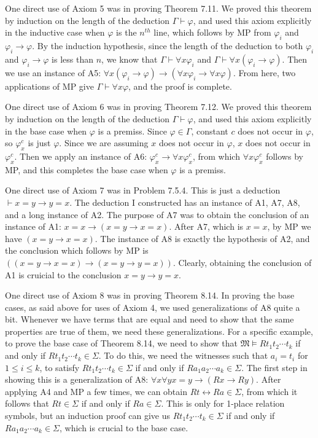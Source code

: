 \documentclass[11pt]{hmcpset}
\newenvironment{problem2}[1]{\noindent {\bf (#1}}
{\medskip}
\begin{document}
\begin{problem2}{b)}
One direct use of Axiom 5 was in proving Theorem 7.11. We proved this theorem by induction on the length of the deduction $\Gamma\vdash\varphi$, and used this axiom explicitly in the inductive case when $\varphi$ is the $n^{th}$ line, which follows by MP from $\varphi_i$ and $\varphi_i\to\varphi$. By the induction hypothesis, since the length of the deduction to both $\varphi_i$ and $\varphi_i\to\varphi$ is less than $n$, we know that $\Gamma\vdash\forall x\varphi_i$ and $\Gamma\vdash\forall x(\varphi_i\to\varphi)$. Then we use an instance of A5: $\forall x(\varphi_i\to\varphi)\to(\forall x\varphi_i\to\forall x\varphi)$. From here, two applications of MP give $\Gamma\vdash\forall x\varphi$, and the proof is complete.

One direct use of Axiom 6 was in proving Theorem 7.12. We proved this theorem by induction on the length of the deduction $\Gamma\vdash\varphi$, and used this axiom explicitly in the base case when $\varphi$ is a premiss. Since $\varphi \in \Gamma$, constant $c$ does not occur in $\varphi$, so $\varphi_x^c$ is just $\varphi$. Since we are assuming $x$ does not occur in $\varphi$, $x$ does not occur in $\varphi_x^c$. Then we apply an instance of A6: $\varphi_x^c\to\forall x\varphi_x^c$, from which $\forall x\varphi_x^c$ follows by MP, and this completes the base case when $\varphi$ is a premiss.

One direct use of Axiom 7 was in Problem 7.5.4. This is just a deduction $\vdash x=y\to y=x$. The deduction I constructed has an instance of A1, A7, A8, and a long instance of A2. The purpose of A7 was to obtain the conclusion of an instance of A1: $x=x\to(x=y\to x=x)$. After A7, which is $x=x$, by MP we have $(x=y\to x=x)$. The instance of A8 is exactly the hypothesis of A2, and the conclusion which follows by MP is $((x=y\to x=x)\to(x=y\to y=x))$. Clearly, obtaining the conclusion of A1 is cruicial to the conclusion $x=y\to y=x$.

One direct use of Axiom 8 was in proving Theorem 8.14. In proving the base cases, as said above for uses of Axiom 4, we used generalizations of A8 quite a bit. Whenever we have terms that are equal and need to show that the same properties are true of them, we need these generalizations. For a specific example, to prove the base case of Theorem 8.14, we need to show that $\mathfrak{M}\vDash Rt_1t_2\cdots t_k$ if and only if $Rt_1t_2\cdots t_k \in \Sigma$. To do this, we need the witnesses such that $a_i=t_i$ for $1\le i\le k$, to satisfy $Rt_1t_2\cdots t_k\in\Sigma$ if and only if $Ra_1a_2\cdots a_k\in\Sigma$. The first step in showing this is a generalization of A8: $\forall x\forall yx=y\to(Rx\to Ry)$. After applying A4 and MP a few times, we can obtain $Rt\leftrightarrow Ra\in\Sigma$, from which it follows that $Rt\in\Sigma$ if and only if $Ra\in\Sigma$. This is only for 1-place relation symbols, but an induction proof can give us $Rt_1t_2\cdots t_k\in\Sigma$ if and only if $Ra_1a_2\cdots a_k\in\Sigma$, which is crucial to the base case.
\end{problem2}
\end{document}
